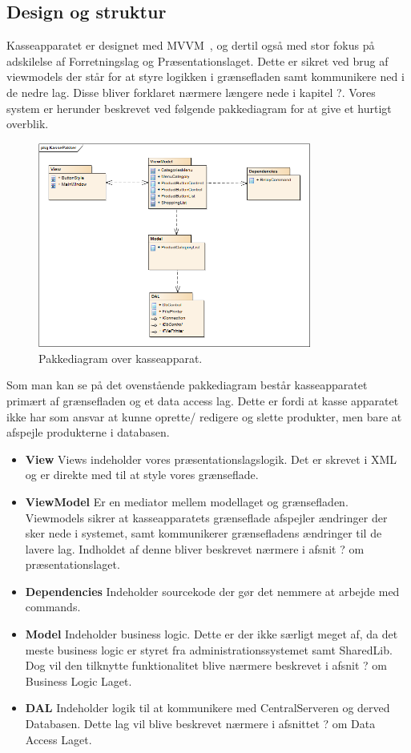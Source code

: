\subsection{Design og struktur}
Kasseapparatet er designet med MVVM~\cite{MVVM}, og dertil også med stor fokus på adskilelse af Forretningslag og Præsentationslaget. Dette er sikret ved brug af viewmodels der står for at styre logikken i grænsefladen samt kommunikere ned i de nedre lag. Disse bliver forklaret nærmere længere nede i kapitel ?.
Vores system er herunder beskrevet ved følgende pakkediagram for at give et hurtigt overblik.	

\begin{figure}[H]
	\centering
	\includegraphics[width=0.8\textwidth]{Systemdesign/Frontend/pics/KassePakker}
	\caption{Pakkediagram over kasseapparat.}
	\label{fig:EndeligeGUI}
\end{figure}

Som man kan se på det ovenstående pakkediagram består kasseapparatet primært af grænsefladen og et data access lag. Dette er fordi at kasse apparatet ikke har som ansvar at kunne oprette/ redigere og slette produkter, men bare at afspejle produkterne i databasen. 

\begin{itemize}
	\item \textbf{View} Views indeholder vores præsentationslagslogik. Det er skrevet i XML og er direkte med til at style vores grænseflade.
	\item \textbf{ViewModel} Er en mediator mellem modellaget og grænsefladen. Viewmodels sikrer at kasseapparatets grænseflade afspejler ændringer der sker nede i systemet, samt kommunikerer grænsefladens ændringer til de lavere lag. Indholdet af denne bliver beskrevet nærmere i afsnit ? om præsentationslaget.
	\item \textbf{Dependencies} Indeholder sourcekode der gør det nemmere at arbejde med commands.
	\item \textbf{Model} Indeholder business logic. Dette er der ikke særligt meget af, da det meste business logic er styret fra administrationssystemet samt SharedLib. Dog vil den tilknytte funktionalitet blive nærmere beskrevet i afsnit ? om Business Logic Laget.
	\item \textbf{DAL} Indeholder logik til at kommunikere med CentralServeren og derved Databasen. Dette lag vil blive beskrevet nærmere i afsnittet ? om Data Access Laget.
\end{itemize}



